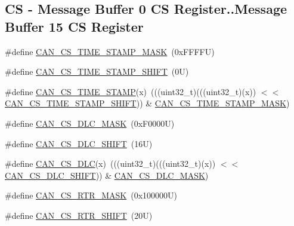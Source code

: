\subsection*{CS -\/ Message Buffer 0 CS Register..Message Buffer 15 CS Register}
\begin{DoxyCompactItemize}
\item 
\#define \mbox{\hyperlink{group___c_a_n___register___masks_ga70e77ee06fb6bf69b46020d1e3b91819}{C\+A\+N\+\_\+\+C\+S\+\_\+\+T\+I\+M\+E\+\_\+\+S\+T\+A\+M\+P\+\_\+\+M\+A\+SK}}~(0x\+F\+F\+F\+F\+U)
\item 
\#define \mbox{\hyperlink{group___c_a_n___register___masks_gaa9e77f6476678316f4bedf1b02afe0d0}{C\+A\+N\+\_\+\+C\+S\+\_\+\+T\+I\+M\+E\+\_\+\+S\+T\+A\+M\+P\+\_\+\+S\+H\+I\+FT}}~(0\+U)
\item 
\#define \mbox{\hyperlink{group___c_a_n___register___masks_gadd5ca585a16641a7a0046706f91185ce}{C\+A\+N\+\_\+\+C\+S\+\_\+\+T\+I\+M\+E\+\_\+\+S\+T\+A\+MP}}(x)~(((uint32\+\_\+t)(((uint32\+\_\+t)(x)) $<$$<$ \mbox{\hyperlink{group___c_a_n___register___masks_gaa9e77f6476678316f4bedf1b02afe0d0}{C\+A\+N\+\_\+\+C\+S\+\_\+\+T\+I\+M\+E\+\_\+\+S\+T\+A\+M\+P\+\_\+\+S\+H\+I\+FT}})) \& \mbox{\hyperlink{group___c_a_n___register___masks_ga70e77ee06fb6bf69b46020d1e3b91819}{C\+A\+N\+\_\+\+C\+S\+\_\+\+T\+I\+M\+E\+\_\+\+S\+T\+A\+M\+P\+\_\+\+M\+A\+SK}})
\item 
\#define \mbox{\hyperlink{group___c_a_n___register___masks_ga968a36f7478c9fad396ac64b5f1f18a2}{C\+A\+N\+\_\+\+C\+S\+\_\+\+D\+L\+C\+\_\+\+M\+A\+SK}}~(0x\+F0000\+U)
\item 
\#define \mbox{\hyperlink{group___c_a_n___register___masks_ga4e110f941e1580ad04b71b8ee68605ce}{C\+A\+N\+\_\+\+C\+S\+\_\+\+D\+L\+C\+\_\+\+S\+H\+I\+FT}}~(16\+U)
\item 
\#define \mbox{\hyperlink{group___c_a_n___register___masks_ga5c0c74dd9d5bddf256e4badb7ba3d9c6}{C\+A\+N\+\_\+\+C\+S\+\_\+\+D\+LC}}(x)~(((uint32\+\_\+t)(((uint32\+\_\+t)(x)) $<$$<$ \mbox{\hyperlink{group___c_a_n___register___masks_ga4e110f941e1580ad04b71b8ee68605ce}{C\+A\+N\+\_\+\+C\+S\+\_\+\+D\+L\+C\+\_\+\+S\+H\+I\+FT}})) \& \mbox{\hyperlink{group___c_a_n___register___masks_ga968a36f7478c9fad396ac64b5f1f18a2}{C\+A\+N\+\_\+\+C\+S\+\_\+\+D\+L\+C\+\_\+\+M\+A\+SK}})
\item 
\#define \mbox{\hyperlink{group___c_a_n___register___masks_ga64cd76de04f63c4e897feab93243a4d1}{C\+A\+N\+\_\+\+C\+S\+\_\+\+R\+T\+R\+\_\+\+M\+A\+SK}}~(0x100000\+U)
\item 
\#define \mbox{\hyperlink{group___c_a_n___register___masks_ga3298f7864757605895c4495c51d4f675}{C\+A\+N\+\_\+\+C\+S\+\_\+\+R\+T\+R\+\_\+\+S\+H\+I\+FT}}~(20\+U)

\end{DoxyCompactItemize}
